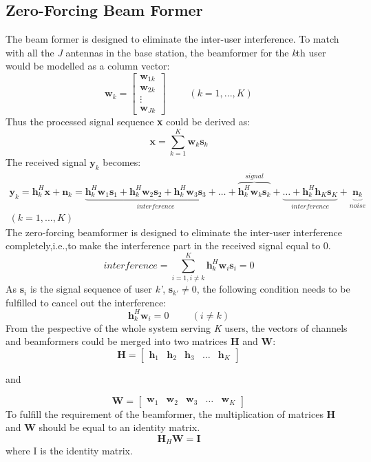 \documentclass{article}
\begin{document}
\subsection{Zero-Forcing Beam Former}
The beam former is designed to eliminate the inter-user interference.
To match with all the \textit{J} antennas in the base station,
the beamformer for the \textit{k}th user would be modelled as a column vector:
\[
\textbf{w}_k
=
\begin{bmatrix}
    \textbf{w}_{1k} \\
    \textbf{w}_{2k} \\
    \vdots \\
    \textbf{w}_{Jk}
\end{bmatrix} \hspace{1cm}(k = 1,...,K)
\]
Thus the processed signal sequence \textbf{x} could be derived as:
\[
\textbf{x} = \sum_{k=1}^{K}\textbf{w}_k\textbf{s}_k
\]
The received signal $\textbf{y}_k$ becomes:
\[
\begin{split}
\textbf{y}_k = \textbf{h}_k^H\textbf{x}+\textbf{n}_k = \underbrace{
\textbf{h}_k^H\textbf{w}_1\textbf{s}_1 +\textbf{h}_k^H\textbf{w}_2\textbf{s}_2+\textbf{h}_k^H\textbf{w}_3\textbf{s}_3
+\dots}_{interference}+\overbrace{\textbf{h}_k^H\textbf{w}_k\textbf{s}_k}^{signal}+
\underbrace{\dots+\textbf{h}_k^H\textbf{h}_K\textbf{s}_K}_{interference} +\underbrace{\textbf{n}_k}_{noise} \\
(k = 1,...,K)
\end{split}
\]
The zero-forcing beamformer is designed to eliminate the inter-user interference completely,i.e.,to make the interference part in the received signal equal to 0.
\[
\textit{interference} = \sum_{i = 1,i\neq k}^{K}\textbf{h}_k^H\textbf{w}_{i}\textbf{s}_{i} = 0
\]
As $\textbf{s}_{i}$ is the signal sequence of user \textit{k'}, $\textbf{s}_{k'} \neq 0$, the following condition needs to be fulfilled to cancel out the interference:
\[
\textbf{h}_k^H\textbf{w}_{i} = 0 \hspace{1cm}(i \neq k)
\]
From the pespective of the whole system serving \textit{K} users, the vectors of channels and beamformers could be merged into
two matrices \textbf{H} and \textbf{W}:
\[
\textbf{H}
=
\begin{bmatrix}
    \textbf{h}_{1} & \textbf{h}_{2} & \textbf{h}_{3} & \dots  & \textbf{h}_{K}
\end{bmatrix}
\]
\begin{center}
and
\end{center}
\[
\textbf{W}
=
\begin{bmatrix}
    \textbf{w}_{1} & \textbf{w}_{2} & \textbf{w}_{3} & \dots  & \textbf{w}_{K}
\end{bmatrix}
\]
To fulfill the requirement of the beamformer, the multiplication of matrices \textbf{H} and \textbf{W} should be equal to an identity matrix.
\[
\textbf{H}_H\textbf{W} = \textbf{I}
\]
where I is the identity matrix.
\end{document}
